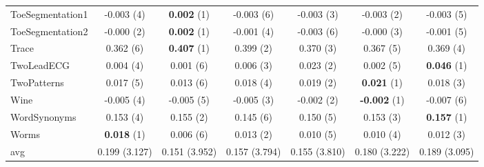 \begin{table}[ht]
\begin{adjustbox}{width=\textwidth}
\begin{tabular}{lcccccc}
ToeSegmentation1 & -0.003 (4) & \textbf{0.002} (1) & -0.003 (6) & -0.003 (3) & -0.003 (2) & -0.003 (5) \\
ToeSegmentation2 & -0.000 (2) & \textbf{0.002} (1) & -0.001 (4) & -0.003 (6) & -0.000 (3) & -0.001 (5) \\
Trace & 0.362 (6) & \textbf{0.407} (1) & 0.399 (2) & 0.370 (3) & 0.367 (5) & 0.369 (4) \\
TwoLeadECG & 0.004 (4) & 0.001 (6) & 0.006 (3) & 0.023 (2) & 0.002 (5) & \textbf{0.046} (1) \\
TwoPatterns & 0.017 (5) & 0.013 (6) & 0.018 (4) & 0.019 (2) & \textbf{0.021} (1) & 0.018 (3) \\
Wine & -0.005 (4) & -0.005 (5) & -0.005 (3) & -0.002 (2) & \textbf{-0.002} (1) & -0.007 (6) \\
WordSynonyms & 0.153 (4) & 0.155 (2) & 0.145 (6) & 0.150 (5) & 0.153 (3) & \textbf{0.157} (1) \\
Worms & \textbf{0.018} (1) & 0.006 (6) & 0.013 (2) & 0.010 (5) & 0.010 (4) & 0.012 (3) \\
\hline 
avg & 0.199 (3.127) & 0.151 (3.952) & 0.157 (3.794) & 0.155 (3.810) & 0.180 (3.222) & 0.189 (3.095) \\ 
\hline
\end{tabular}
\end{adjustbox}
\end{table}


